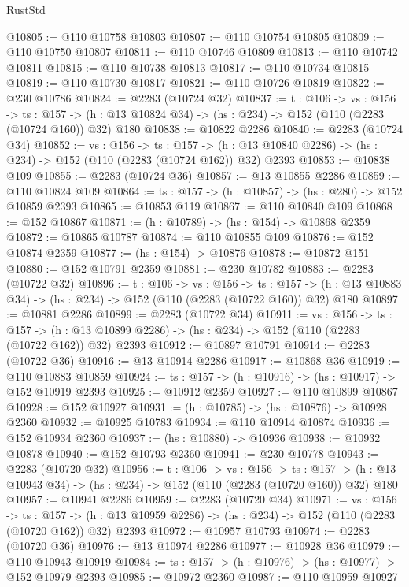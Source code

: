 \begin{lexlean}{RustStd}
\begin{coremodule}
@10805 := @110 @10758 @10803
@10807 := @110 @10754 @10805
@10809 := @110 @10750 @10807
@10811 := @110 @10746 @10809
@10813 := @110 @10742 @10811
@10815 := @110 @10738 @10813
@10817 := @110 @10734 @10815
@10819 := @110 @10730 @10817
@10821 := @110 @10726 @10819
@10822 := @230 @10786
@10824 := @2283 (@10724 @32)
@10837 := {t : @106} ->
  {vs : @156} ->
  {ts : @157} -> (h : @13 @10824 @34) -> (hs : @234) -> @152 (@110 (@2283 (@10724 @160)) @32) @180
@10838 := @10822 @2286
@10840 := @2283 (@10724 @34)
@10852 := {vs : @156} ->
  {ts : @157} ->
  (h : @13 @10840 @2286) -> (hs : @234) -> @152 (@110 (@2283 (@10724 @162)) @32) @2393
@10853 := @10838 @109
@10855 := @2283 (@10724 @36)
@10857 := @13 @10855 @2286
@10859 := @110 @10824 @109
@10864 := {ts : @157} -> (h : @10857) -> (hs : @280) -> @152 @10859 @2393
@10865 := @10853 @119
@10867 := @110 @10840 @109
@10868 := @152 @10867
@10871 := (h : @10789) -> (hs : @154) -> @10868 @2359
@10872 := @10865 @10787
@10874 := @110 @10855 @109
@10876 := @152 @10874 @2359
@10877 := (hs : @154) -> @10876
@10878 := @10872 @151
@10880 := @152 @10791 @2359
@10881 := @230 @10782
@10883 := @2283 (@10722 @32)
@10896 := {t : @106} ->
  {vs : @156} ->
  {ts : @157} -> (h : @13 @10883 @34) -> (hs : @234) -> @152 (@110 (@2283 (@10722 @160)) @32) @180
@10897 := @10881 @2286
@10899 := @2283 (@10722 @34)
@10911 := {vs : @156} ->
  {ts : @157} ->
  (h : @13 @10899 @2286) -> (hs : @234) -> @152 (@110 (@2283 (@10722 @162)) @32) @2393
@10912 := @10897 @10791
@10914 := @2283 (@10722 @36)
@10916 := @13 @10914 @2286
@10917 := @10868 @36
@10919 := @110 @10883 @10859
@10924 := {ts : @157} -> (h : @10916) -> (hs : @10917) -> @152 @10919 @2393
@10925 := @10912 @2359
@10927 := @110 @10899 @10867
@10928 := @152 @10927
@10931 := (h : @10785) -> (hs : @10876) -> @10928 @2360
@10932 := @10925 @10783
@10934 := @110 @10914 @10874
@10936 := @152 @10934 @2360
@10937 := (hs : @10880) -> @10936
@10938 := @10932 @10878
@10940 := @152 @10793 @2360
@10941 := @230 @10778
@10943 := @2283 (@10720 @32)
@10956 := {t : @106} ->
  {vs : @156} ->
  {ts : @157} -> (h : @13 @10943 @34) -> (hs : @234) -> @152 (@110 (@2283 (@10720 @160)) @32) @180
@10957 := @10941 @2286
@10959 := @2283 (@10720 @34)
@10971 := {vs : @156} ->
  {ts : @157} ->
  (h : @13 @10959 @2286) -> (hs : @234) -> @152 (@110 (@2283 (@10720 @162)) @32) @2393
@10972 := @10957 @10793
@10974 := @2283 (@10720 @36)
@10976 := @13 @10974 @2286
@10977 := @10928 @36
@10979 := @110 @10943 @10919
@10984 := {ts : @157} -> (h : @10976) -> (hs : @10977) -> @152 @10979 @2393
@10985 := @10972 @2360
@10987 := @110 @10959 @10927

\end{coremodule}
\end{lexlean}
